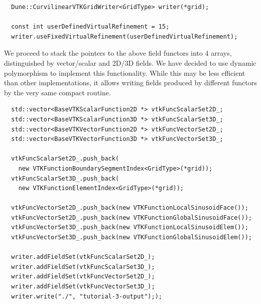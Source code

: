 \begin{mybox}
\begin{lstlisting}    
  Dune::CurvilinearVTKGridWriter<GridType> writer(*grid);
    
  const int userDefinedVirtualRefinement = 15;
  writer.useFixedVirtualRefinement(userDefinedVirtualRefinement);
\end{lstlisting}
\end{mybox}

\noindent
We proceed to stack the pointers to the above field functors into 4 arrays, distinguished by vector/scalar and 2D/3D fields. We have decided to use dynamic polymorphism to implement this functionality. While this may be less efficient than other implementations, it allows writing fields produced by different functors by the very same compact routine.  \\

\begin{mybox}
\begin{lstlisting}    
  std::vector<BaseVTKScalarFunction2D *> vtkFuncScalarSet2D_;
  std::vector<BaseVTKScalarFunction3D *> vtkFuncScalarSet3D_;
  std::vector<BaseVTKVectorFunction2D *> vtkFuncVectorSet2D_;
  std::vector<BaseVTKVectorFunction3D *> vtkFuncVectorSet3D_;

  vtkFuncScalarSet2D_.push_back(
    new VTKFunctionBoundarySegmentIndex<GridType>(*grid));
  vtkFuncScalarSet3D_.push_back(
    new VTKFunctionElementIndex<GridType>(*grid));

  vtkFuncVectorSet2D_.push_back(new VTKFunctionLocalSinusoidFace());
  vtkFuncVectorSet2D_.push_back(new VTKFunctionGlobalSinusoidFace());
  vtkFuncVectorSet3D_.push_back(new VTKFunctionLocalSinusoidElem());
  vtkFuncVectorSet3D_.push_back(new VTKFunctionGlobalSinusoidElem());

  writer.addFieldSet(vtkFuncScalarSet2D_);
  writer.addFieldSet(vtkFuncScalarSet3D_);
  writer.addFieldSet(vtkFuncVectorSet2D_);
  writer.addFieldSet(vtkFuncVectorSet3D_);
  writer.write("./", "tutorial-3-output"););
\end{lstlisting}
\end{mybox}
	
